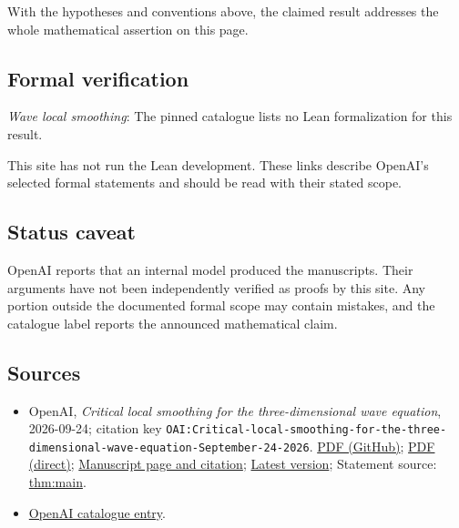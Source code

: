\documentclass[11pt]{article}
\begin{document}
With the hypotheses and conventions above, the claimed result addresses the whole mathematical assertion on this page.

\subsection{Formal verification}
\textit{Wave local smoothing}: The pinned catalogue lists no Lean formalization for this result.

This site has not run the Lean development. These links describe OpenAI’s selected formal statements and should be read with their stated scope.

\subsection{Status caveat}
OpenAI reports that an internal model produced the manuscripts. Their arguments have not been independently verified as proofs by this site. Any portion outside the documented formal scope may contain mistakes, and the catalogue label reports the announced mathematical claim.

\subsection{Sources}
\begin{itemize}
\item OpenAI, \emph{Critical local smoothing for the three-dimensional wave equation}, 2026-09-24; citation key \texttt{OAI:Critical-local-smoothing-for-the-three-dimensional-wave-equation-September-24-2026}. \href{https://github.com/openai/math/blob/adc7f1241b42e322a6451854ab7e4b4c146bf78a/preprints/Critical-local-smoothing-for-the-three-dimensional-wave-equation-September-24-2026/paper.pdf}{PDF (GitHub)}; \href{https://github.com/openai/math/raw/adc7f1241b42e322a6451854ab7e4b4c146bf78a/preprints/Critical-local-smoothing-for-the-three-dimensional-wave-equation-September-24-2026/paper.pdf}{PDF (direct)}; \href{https://github.com/openai/math/blob/adc7f1241b42e322a6451854ab7e4b4c146bf78a/preprints/Critical-local-smoothing-for-the-three-dimensional-wave-equation-September-24-2026/README.md}{Manuscript page and citation}; \href{https://github.com/openai/math/blob/main/preprints/Critical-local-smoothing-for-the-three-dimensional-wave-equation-September-24-2026/paper.pdf}{Latest version}; Statement source: \href{https://github.com/openai/math/blob/adc7f1241b42e322a6451854ab7e4b4c146bf78a/preprints/Critical-local-smoothing-for-the-three-dimensional-wave-equation-September-24-2026/build/sections/00-introduction.tex\#L25}{thm:main}.
\item \href{https://github.com/openai/math/blob/adc7f1241b42e322a6451854ab7e4b4c146bf78a/CONTENTS.md}{OpenAI catalogue entry}.
\end{itemize}
\end{document}
